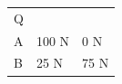 \begin{enumerate}[noitemsep, label=\textbf{\arabic*}. ]
{\begin{tabular}[t]{|l|l|l|}
    
        Q%
     \tabularnewline\cline{1-1}\cline{2-2}\cline{3-3}
    
    
        A &
    
    
        100 N &
    
    
        0 N%
     \tabularnewline\cline{1-1}\cline{2-2}\cline{3-3}
    
    
        B &
    
    
        25 N &
    
    
        75 N%
     \tabularnewline\cline{1-1}\cline{2-2}\cline{3-3}
    
    

\end{tabular}}
\end{enumerate}
